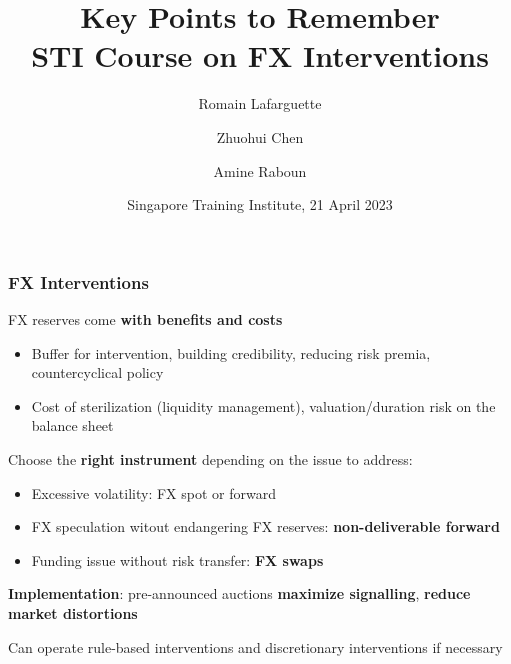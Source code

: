 \documentclass{beamer}
\title[Key Points]{Key Points to Remember \\ STI Course on FX Interventions}
\author[Lafarguette]{Romain Lafarguette \and Zhuohui Chen  \and Amine Raboun}
\institute[IMF STX]{Quants \& IMF MCM \& IMF External Experts\blfootnote{\scriptsize{\emph{This training material is the property of the IMF, any reuse requires IMF permission}}} \\
}
\date[STI, 21 April 2023]{\footnotesize Singapore Training Institute, 21 April 2023}
\newenvironment{wideitemize}{\itemize\addtolength{\itemsep}{10pt}}{\enditemize}
\begin{document}
\begin{frame}
\maketitle
\end{frame}



\begin{frame}
  \frametitle{FX Interventions}
  \begin{wideitemize}
  \item FX reserves come \textbf{with benefits and costs}
    \begin{itemize}
    \item Buffer for intervention, building credibility, reducing risk premia, countercyclical policy
    \item Cost of sterilization (liquidity management), valuation/duration risk on the balance sheet
    \end{itemize}
  \item Choose the \textbf{right instrument} depending on the issue to address:
    \begin{itemize}
    \item Excessive volatility: FX spot or forward
    \item FX speculation witout endangering FX reserves: \textbf{non-deliverable forward}
    \item Funding issue without risk transfer: \textbf{FX swaps}
    \end{itemize}
  \item \textbf{Implementation}: pre-announced auctions \textbf{maximize signalling}, \textbf{reduce market distortions}
  \item Can operate rule-based interventions and discretionary interventions if necessary
  \end{wideitemize}

  
\end{frame}
\end{document}
